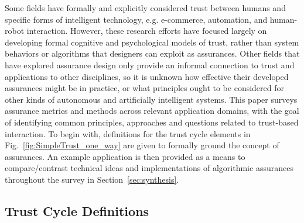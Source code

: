 Some fields have formally and explicitly considered trust between humans and specific forms of intelligent technology, e.g. e-commerce, automation, and human-robot interaction. However, these research efforts have focused largely on developing formal cognitive and psychological models of trust, rather than system behaviors or algorithms that designers can exploit as assurances. 
Other fields that have explored assurance design only provide an informal connection to trust and applications to other disciplines, so it is unknown how effective their developed assurances might be in practice, or what principles ought to be considered for other kinds of autonomous and artificially intelligent systems. 
This paper surveys assurance metrics and methods across relevant application domains, with the goal of
identifying common principles, approaches and questions related to trust-based interaction.
To begin with, definitions for the trust cycle elements in Fig.~\ref{fig:SimpleTrust_one_way} are given to formally ground the concept of assurances. An example application is then provided as a means to compare/contrast technical ideas and implementations of algorithmic assurances throughout the survey in Section~\ref{sec:synthesis}. 


\subsection{Trust Cycle Definitions} \label{sec:trust_definitions}



